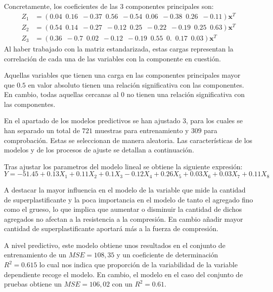 \noindent Concretamente, los coeficientes de las 3 componentes principales son:
\begin{align}
Z_1&=(0.04 \enspace 0.16  \enspace  -0.37  \enspace 0.56  \enspace   -0.54  \enspace  0.06 \enspace  -0.38  \enspace 0.26  \enspace -0.11)\mathbf{x}^T\\
Z_2&=(0.54 \enspace 0.14 \enspace  -0.27  \enspace -0.12 \enspace   0.25  \enspace -0.22 \enspace  -0.19 \enspace  0.25  \enspace  0.63)\mathbf{x}^T\\
Z_3&=(0.36 \enspace -0.7 \enspace  0.02 \enspace-0.12\enspace -0.19  \enspace 0.55 \enspace 0. \enspace   0.17 \enspace 0.03)\mathbf{x}^T
\end{align}
\noindent Al haber trabajado con la matriz estandarizada, estas cargas representan la correlación de cada una de las variables con la componente en cuestión. 

\noindent Aquellas variables que tienen una carga en las componentes principales mayor que $0.5$ en valor absoluto tienen una relación significativa con las componentes. En cambio, todas aquellas cercanas al $0$ no tienen una relación significativa con las componentes. 

\noindent En el apartado de los modelos predictivos se han ajustado 3, para los cuales se han separado un total de $721$ muestras para entrenamiento y $309$ para comprobación. Estas se seleccionan de manera aleatoria.
\noindent Las características de los modelos y de los procesos de ajuste se detallan a continuación. 

\noindent Tras ajustar los parametros del modelo lineal se obtiene la siguiente expresión:
{\footnotesize
 \begin{equation}
Y=-51.45+0.13 X_1+0.11X_2+0.1X_3-0.12X_4+0.26X_5+  0.03X_6+0.03X_7+0.11X_8
\end{equation}}

\noindent A destacar la mayor influencia en el modelo de la variable que mide la cantidad de superplastificante y la poca importancia en el modelo de tanto el agregado fino como el grueso, lo que implica que aumentar o disminuir la cantidad de dichos agregados no afectan a la resistencia a la compresión. En cambio añadir mayor cantidad de superplastificante aportará más a la fuerza de compresión.
  
\noindent A nivel predictivo, este modelo obtiene unos resultados en el conjunto de entrenamiento de un $MSE=108,35$ y un coeficiente de determinación $R^2=0.615$ lo cual nos indica que proporción de la variabilidad de la variable dependiente recoge el modelo. En cambio, el modelo en el caso del conjunto de pruebas obtiene un $MSE=106,02$ con un $R^2=0.61$. 

